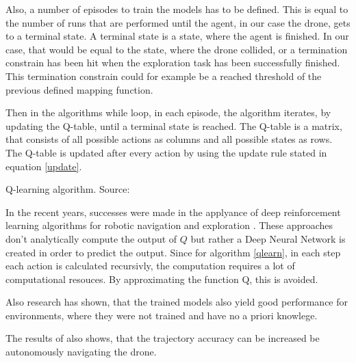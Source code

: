 \begin{enumerate}
	Also, a number of episodes to train the models has to be defined. This is equal to the number of runs that are 
    performed until the agent, in our case the drone, gets to a terminal state. A terminal state is a state, where the agent is finished. In our case, that would 
	be equal to the state, where the drone collided, or a termination constrain has been hit when the exploration task has been successfully finished.
	This termination constrain could for example be a reached 
	threshold of the previous defined mapping function. 
	
	Then in the algorithms while loop, in each episode, the algorithm iterates, by updating the Q-table, until 
	a terminal state is reached. 
	The Q-table is a matrix, that consists of all possible actions as columns and all possible states as rows. The Q-table is updated after every action by 
	using the update rule stated in equation \ref{update}. 
	
	
	\begin{algorithm}[H]
	\KwData{Parameters: $\alpha \in (0,1], \gamma \in (0,1],$ \ Initialize Q-table with arbitrary Q-values }
	\caption{Q-learning algorithm. Source: \cite{deep}}\label{qlearn}
	\end{algorithm}
	
	
	In the recent years, successes were made in the applyance of deep reinforcement learning algorithms for robotic navigation and exploration \cite{deep} \cite{accurat}. 
	These approaches don't analytically compute the output of $Q$ but rather a Deep Neural Network is created in order to predict the output. 
	Since for algorithm \ref{qlearn}, in each step each action is calculated recursivly, the computation requires a lot of computational resouces. By approximating the function Q, this is avoided. 
	
	Also research has shown, that the trained models also yield good performance for environments, where they were not trained and have no a priori knowlege. 

	
	The results of \cite{deep} also shows, that the trajectory accuracy can be increased be autonomously navigating the drone. 
	\begin{quote}
	

\end{quote}
\end{enumerate}
